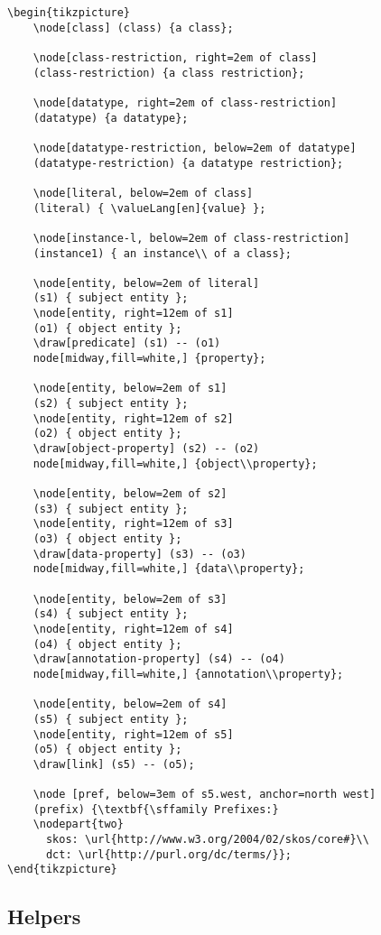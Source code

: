 \begin{verbatim}
\begin{tikzpicture}
	\node[class] (class) {a class};
	
	\node[class-restriction, right=2em of class]
	(class-restriction) {a class restriction};
	
	\node[datatype, right=2em of class-restriction]
	(datatype) {a datatype};
	
	\node[datatype-restriction, below=2em of datatype]
	(datatype-restriction) {a datatype restriction};
	
	\node[literal, below=2em of class]
	(literal) { \valueLang[en]{value} };	
	
	\node[instance-l, below=2em of class-restriction]
	(instance1) { an instance\\ of a class};
	
	\node[entity, below=2em of literal]
	(s1) { subject entity };	
	\node[entity, right=12em of s1]
	(o1) { object entity };	
	\draw[predicate] (s1) -- (o1)
	node[midway,fill=white,] {property};
	
	\node[entity, below=2em of s1]
	(s2) { subject entity };
	\node[entity, right=12em of s2]
	(o2) { object entity };
	\draw[object-property] (s2) -- (o2)
	node[midway,fill=white,] {object\\property};
	
	\node[entity, below=2em of s2]
	(s3) { subject entity };
	\node[entity, right=12em of s3]
	(o3) { object entity };
	\draw[data-property] (s3) -- (o3)
	node[midway,fill=white,] {data\\property};
	
	\node[entity, below=2em of s3]
	(s4) { subject entity };
	\node[entity, right=12em of s4]
	(o4) { object entity };
	\draw[annotation-property] (s4) -- (o4)
	node[midway,fill=white,] {annotation\\property};
	
	\node[entity, below=2em of s4]
	(s5) { subject entity };
	\node[entity, right=12em of s5]
	(o5) { object entity };
	\draw[link] (s5) -- (o5);
	
	\node [pref, below=3em of s5.west, anchor=north west]
	(prefix) {\textbf{\sffamily Prefixes:}
	\nodepart{two} 
	  skos: \url{http://www.w3.org/2004/02/skos/core#}\\ 
	  dct: \url{http://purl.org/dc/terms/}};
\end{tikzpicture}	
\end{verbatim}

\subsection{Helpers}

